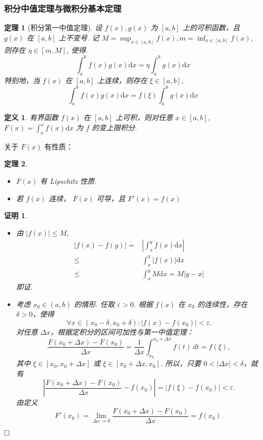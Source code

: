 \documentclass{ctexart}
\newcommand{\。}{．} %
\newcommand{\dx}{\mathrm{d}x}
\newenvironment{lvse}{
    \begin{tcolorbox}[enhanced, breakable, colback=qlv, boxrule=0pt, frame hidden,
        borderline west={0.7mm}{0.1mm}{slv}]
    }
    {\end{tcolorbox}}
\newenvironment{lanse}{
    \begin{tcolorbox}[enhanced, breakable, colback=qlan, boxrule=0pt, frame hidden,
        borderline west={0.7mm}{0.1mm}{slan}]
    }
    {\end{tcolorbox}}
\newenvironment{huangse}{
    \begin{tcolorbox}[enhanced, breakable, colback=qhuang, boxrule=0pt, frame hidden,
        borderline west={0.7mm}{0.1mm}{shuang}]
    }
    {\end{tcolorbox}}
\theoremstyle{t} %
\newtheorem{dyhj}{\color{slv} 定义}[subsection] %
\newtheorem{dlhj}{\color{shuang} 定理}[subsection]
\newtheorem*{zmhj}{\color{slan} 证明}
\newenvironment{dy}{\begin{lvse}\begin{dyhj}}{\end{dyhj}\end{lvse}}
\newenvironment{zm}{\begin{lanse}\begin{zmhj}}{$\hfill \square$\end{zmhj}\end{lanse}}
\newenvironment{dl}{\begin{huangse}\begin{dlhj}}{\end{dlhj}\end{huangse}}
\begin{document}
\subsubsection{积分中值定理与微积分基本定理}

\begin{dl}[积分第一中值定理]
    设 $f(x), g(x)$ 为 $[a, b]$ 上的可积函数，且 $g(x)$ 在 $[a, b]$ 上不变号. 记 $M = \sup_{x \in [a, b]} f(x), m = \inf_{x \in [a, b]}f(x)$, 则存在 $\eta \in [m, M]$, 使得.
    \[
        \int_{a}^{b}f(x)g(x)\dx = \eta \int_{a}^{b}g(x)\dx
    \]
    特别地，当 $f(x)$ 在 $[a, b]$ 上连续，则存在 $\xi \in [a, b]$, 
    \[
        \int_{a}^{b}f(x)g(x)\dx = f(\xi) \int_{a}^{b}g(x)\dx
    \]
\end{dl}

\begin{dy}
    有界函数 $f(x)$ 在 $[a, b]$ 上可积，则对任意 $x \in [a, b]$, $F(x) = \int_{a}^{x}f(x)\dx$ 为 $f$ 的变上限积分.
\end{dy}

关于 $F(x)$ 有性质：

\begin{dl}\quad
    \begin{itemize}
        \item $F(x)$ 有 Lipschitz 性质.
        \item 若 $f(x)$ 连续， $F(x)$ 可导，且 $F'(x) = f(x)$
    \end{itemize}
\end{dl}

\begin{zm}\quad
    \begin{itemize}
        \item 由 $\left\lvert f(x)\right\rvert \leqslant M$,
        \begin{align*}
            \left\lvert f(x) - f(y)\right\rvert =& \left\lvert \int_{x}^{y}f(x)\dx\right\rvert \\
            \leqslant& \int_{x}^{y}\left\lvert f(x)\right\rvert \dx \\
            \leqslant& \int_{x}^{y} M \dx = M\left\lvert y - x\right\rvert 
        \end{align*}
        即证.
        \item 考虑 $x_0 \in (a, b)$ 的情形. 任取 $\varepsilon > 0$. 根据 $f(x)$ 在 $x_0$ 的连续性，存在 $\delta > 0$，使得
        $$ \forall x \in (x_0 - \delta, x_0 + \delta) : |f(x) - f(x_0)| < \varepsilon. $$ 
        对任意 $\Delta x$，根据定积分的区间可加性与第一中值定理：
        $$ \frac{F(x_0 + \Delta x) - F(x_0)}{\Delta x} = \frac{1}{\Delta x} \int_{x_0}^{x_0 + \Delta x} f(t) \, dt = f(\xi), $$ 
        其中 $\xi \in [x_0, x_0 + \Delta x]$ 或 $\xi \in [x_0 + \Delta x, x_0]$. 所以，只要 $0 < |\Delta x| < \delta$，就有
        $$ \left| \frac{F(x_0 + \Delta x) - F(x_0)}{\Delta x} - f(x_0) \right| = |f(\xi) - f(x_0)| < \varepsilon. $$ 
        由定义
        $$ F'(x_0) = \lim_{\Delta x \to 0} \frac{F(x_0 + \Delta x) - F(x_0)}{\Delta x} = f(x_0). $$ 
    \end{itemize}
\end{zm}
\end{document}
